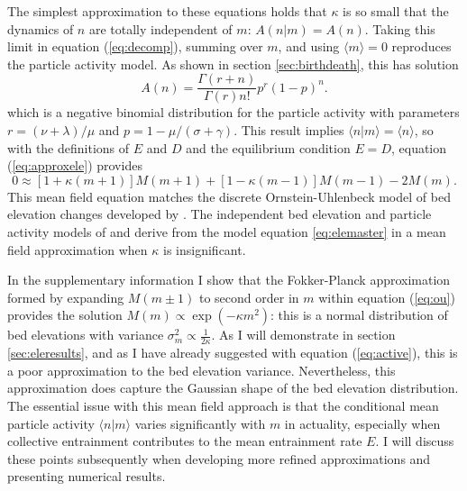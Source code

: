The simplest approximation to these equations holds that $\kappa$ is so small that the dynamics of $n$ are totally independent of $m$: $A(n|m) = A(n)$. Taking this limit in equation (\ref{eq:decomp}), summing over $m$, and using $\langle m \rangle = 0$ reproduces the \citet{Ancey2008} particle activity model.
As shown in section \ref{sec:birthdeath}, this has solution
\begin{equation} A(n) = \frac{\Gamma(r+n)}{\Gamma(r)n!}p^r(1-p)^n.\label{eq:ancey}\end{equation}
which is a negative binomial distribution for the particle activity with parameters $r=(\nu+\lambda)/\mu$ and $p=1-\mu/(\sigma+\gamma).$
This result implies $\langle n | m \rangle = \langle n \rangle$, so with the definitions of $E$ and $D$ and the equilibrium condition $E=D$, equation (\ref{eq:approxele}) provides
\begin{equation}0 \approx [1+\kappa(m+1)]M(m+1) + [1-\kappa(m-1)]M(m-1)-2M(m). \label{eq:ou} \end{equation}
This mean field equation matches the discrete Ornstein-Uhlenbeck model of bed elevation changes developed by \citet{Martin2014}.
The independent bed elevation and particle activity models of \citet{Martin2014} and \citet{Ancey2008} derive from the model equation \ref{eq:elemaster} in a mean field approximation when $\kappa$ is insignificant.

In the supplementary information I show that the Fokker-Planck approximation \citep{Gardiner1983} formed by expanding $M(m\pm 1)$ to second order in $m$ within equation (\ref{eq:ou}) provides the solution $M(m) \propto \exp(-\kappa m^2)$: this is a normal distribution of bed elevations with variance $\sigma_m^2 \propto \frac{1}{2\kappa}$.
As I will demonstrate in section \ref{sec:eleresults}, and as I have already suggested with equation (\ref{eq:active}), this is a poor approximation to the bed elevation variance. Nevertheless, this approximation does capture the Gaussian shape of the bed elevation distribution.
The essential issue with this mean field approach is that the conditional mean particle activity $\langle n | m \rangle$ varies significantly with $m$ in actuality, especially when collective entrainment contributes to the mean entrainment rate $E$. I will discuss these points subsequently when developing more refined approximations and presenting numerical results.

